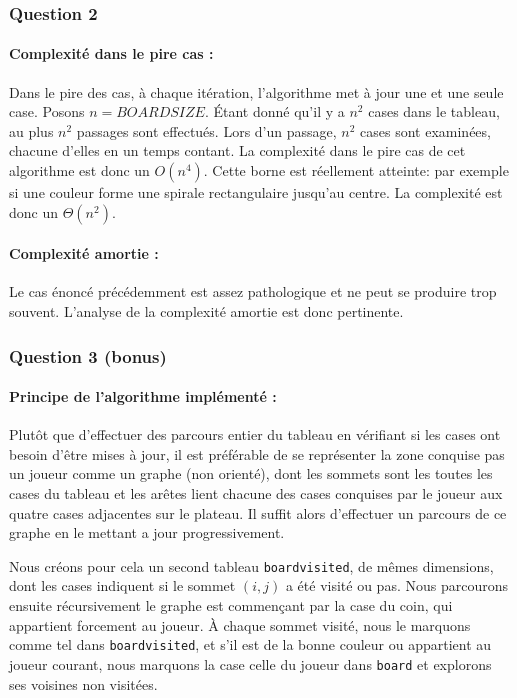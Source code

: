 \documentclass[12pt,a4paper,twoside]{article}
\begin{document}
\subsubsection*{Question 2}
\label{sec:orgheadline5}
\paragraph*{Complexité dans le pire cas :}
\label{sec:orgheadline3}
Dans le pire des cas, à chaque itération, l'algorithme met à jour une
et une seule case. Posons \(n = BOARDSIZE\). Étant donné qu'il y a \(n^{2}\)
cases dans le tableau, au plus \(n^{2}\) passages sont effectués. Lors d'un
passage, \(n^{2}\) cases sont examinées, chacune d'elles en un temps
contant. La complexité dans le pire cas de cet algorithme est donc un
\(O(n^4)\).
Cette borne est réellement atteinte: par exemple si une couleur forme
une spirale rectangulaire jusqu'au centre. La complexité est donc un
\(\Theta(n^{2})\). 
\paragraph*{Complexité amortie :}
\label{sec:orgheadline4}
Le cas énoncé précédemment est assez pathologique et ne peut se
produire trop souvent. L'analyse de la complexité amortie est donc
pertinente.
\subsubsection*{Question 3 (bonus)}
\label{sec:orgheadline8}
\paragraph*{Principe de l'algorithme implémenté :}
\label{sec:orgheadline6}
Plutôt que d'effectuer des parcours entier du tableau en vérifiant si
les cases ont besoin d'être mises à jour, il est préférable de se
représenter la zone conquise pas un joueur comme un graphe (non
orienté), dont les sommets sont les toutes les cases du tableau et les
arêtes lient chacune des cases conquises par le joueur aux quatre
cases adjacentes sur le plateau. Il suffit alors d'effectuer un
parcours de ce graphe en le mettant a jour progressivement. 

Nous créons pour cela un second tableau \texttt{boardvisited}, de
mêmes dimensions, dont les cases indiquent si le sommet \((i,j)\) a été
visité ou pas. Nous parcourons ensuite récursivement le graphe est
commençant par la case du coin, qui appartient forcement au joueur. À
chaque sommet visité, nous le marquons comme tel dans
\texttt{boardvisited}, et s'il est de la bonne couleur ou appartient au
joueur courant, nous marquons la case celle du joueur dans
\texttt{board} et explorons ses voisines non visitées.
\end{document}
